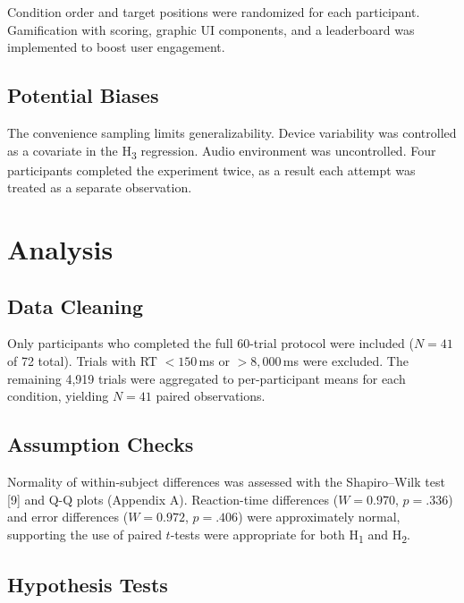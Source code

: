 \documentclass[12pt,letterpaper]{article}
\begin{document}
\vspace{4pt}
\noindent
{}
\vspace{4pt}

Condition order and target positions were randomized for each participant. Gamification with scoring, graphic UI components, and a leaderboard was implemented to boost user engagement.

\subsection{Potential Biases}

The convenience sampling limits generalizability. Device variability was controlled as a covariate in the H\textsubscript{3} regression. Audio environment was uncontrolled. Four participants completed the experiment twice, as a result each attempt was treated as a separate observation.


\section{Analysis}

\subsection{Data Cleaning}

Only participants who completed the full 60-trial protocol were included ($N = 41$ of 72 total). Trials with RT $< 150$\,ms or $> 8{,}000$\,ms were excluded. The remaining 4{,}919 trials were aggregated to per-participant means for each condition, yielding $N = 41$ paired observations.

\subsection{Assumption Checks}

Normality of within-subject differences was assessed with the Shapiro--Wilk test [9] and Q-Q plots (Appendix A). Reaction-time differences ($W = 0.970$, $p = .336$) and error differences ($W = 0.972$, $p = .406$) were approximately normal, supporting the use of paired $t$-tests were appropriate for both H\textsubscript{1} and H\textsubscript{2}.

\subsection{Hypothesis Tests}
\end{document}
